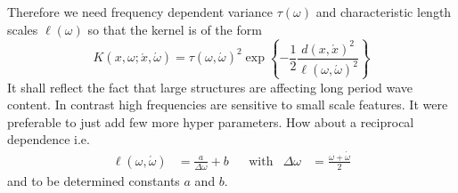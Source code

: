 \documentclass[11pt]{article}
\begin{document}
Therefore we need frequency dependent variance $\tau(\omega)$ and characteristic length scales $\ell(\omega)$ so that the kernel is of the form
\begin{equation}
    K(x,\omega;\acute x,\acute \omega) =
    \tau(\omega,\acute\omega)^2
    \exp\left\{-\frac12 \frac{d(x,\acute x)^2}{\ell(\omega,\acute\omega)^2}\right\}
\end{equation}
It shall reflect the fact that large structures are affecting long period wave content.
In contrast high frequencies are sensitive to small scale features.
It were preferable to just add few more hyper parameters.
How about a reciprocal dependence i.e.
\begin{align}
    \ell(\omega, \acute \omega) &= \frac a{\Delta \omega} + b &
    &\text{with}&
    \Delta \omega &= \frac{\omega + \acute\omega}2
\end{align}
and to be determined constants $a$ and $b$.
\end{document}
